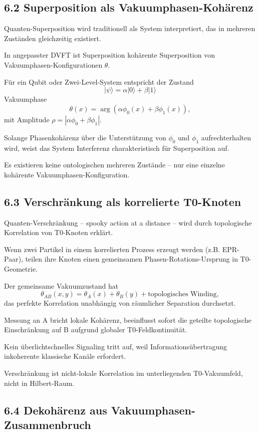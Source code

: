 \documentclass[12pt,a4paper]{article}
\begin{document}
	\subsection{6.2 Superposition als Vakuumphasen-Kohärenz}
	
	Quanten-Superposition wird traditionell als System interpretiert, das in mehreren Zuständen gleichzeitig existiert.
	
	In angepasster DVFT ist Superposition kohärente Superposition von Vakuumphasen-Konfigurationen $\theta$.
	
	Für ein Qubit oder Zwei-Level-System entspricht der Zustand
	\[
	|\psi\rangle = \alpha |0\rangle + \beta |1\rangle
	\]
	Vakuumphase
	\[
	\theta(x) = \arg(\alpha \phi_0(x) + \beta \phi_1(x)),
	\]
	mit Amplitude $\rho = |\alpha \phi_0 + \beta \phi_1|$.
	
	Solange Phasenkohärenz über die Unterstützung von $\phi_0$ und $\phi_1$ aufrechterhalten wird, weist das System Interferenz charakteristisch für Superposition auf.
	
	Es existieren keine ontologischen mehreren Zustände – nur eine einzelne kohärente Vakuumphasen-Konfiguration.
	
	\subsection{6.3 Verschränkung als korrelierte T0-Knoten}
	
	Quanten-Verschränkung – spooky action at a distance – wird durch topologische Korrelation von T0-Knoten erklärt.
	
	Wenn zwei Partikel in einem korrelierten Prozess erzeugt werden (z.B. EPR-Paar), teilen ihre Knoten einen gemeinsamen Phasen-Rotations-Ursprung in T0-Geometrie.
	
	Der gemeinsame Vakuumzustand hat
	\[
	\theta_{AB}(x,y) = \theta_A(x) + \theta_B(y) + \text{topologisches Winding},
	\]
	das perfekte Korrelation unabhängig von räumlicher Separation durchsetzt.
	
	Messung an A bricht lokale Kohärenz, beeinflusst sofort die geteilte topologische Einschränkung auf B aufgrund globaler T0-Feldkontinuität.
	
	Kein überlichtschnelles Signaling tritt auf, weil Informationsübertragung inkoherente klassische Kanäle erfordert.
	
	Verschränkung ist nicht-lokale Korrelation im unterliegenden T0-Vakuumfeld, nicht in Hilbert-Raum.
	
	\subsection{6.4 Dekohärenz aus Vakuumphasen-Zusammenbruch}
	
\end{document}
